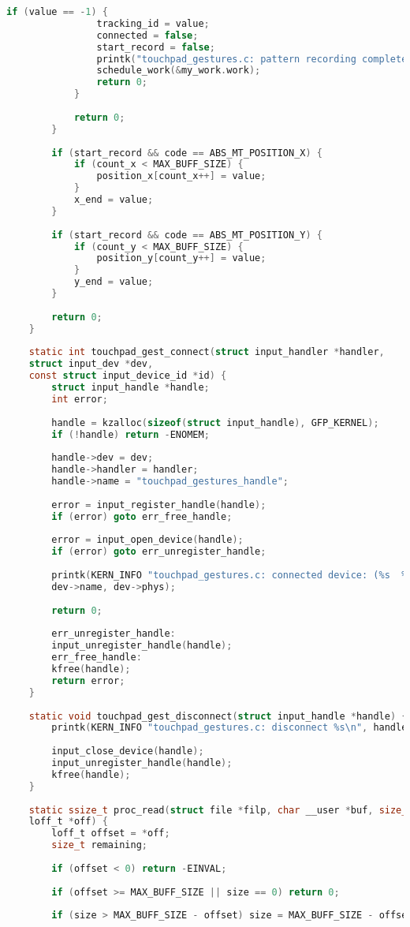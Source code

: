 \begin{lstlisting}[label=lst:module,caption=Реализация загружаемого модуля ядра, language=c]
			if (value == -1) {
				tracking_id = value;
				connected = false;
				start_record = false;
				printk("touchpad_gestures.c: pattern recording complete");
				schedule_work(&my_work.work);
				return 0;
			}
			
			return 0;
		}
		
		if (start_record && code == ABS_MT_POSITION_X) {
			if (count_x < MAX_BUFF_SIZE) {
				position_x[count_x++] = value;
			}
			x_end = value;
		}
		
		if (start_record && code == ABS_MT_POSITION_Y) {
			if (count_y < MAX_BUFF_SIZE) {
				position_y[count_y++] = value;
			}
			y_end = value;
		}
		
		return 0;
	}
	
	static int touchpad_gest_connect(struct input_handler *handler,
	struct input_dev *dev,
	const struct input_device_id *id) {
		struct input_handle *handle;
		int error;
		
		handle = kzalloc(sizeof(struct input_handle), GFP_KERNEL);
		if (!handle) return -ENOMEM;
		
		handle->dev = dev;
		handle->handler = handler;
		handle->name = "touchpad_gestures_handle";
		
		error = input_register_handle(handle);
		if (error) goto err_free_handle;
		
		error = input_open_device(handle);
		if (error) goto err_unregister_handle;
		
		printk(KERN_INFO "touchpad_gestures.c: connected device: (%s  %s)\n",
		dev->name, dev->phys);
		
		return 0;
		
		err_unregister_handle:
		input_unregister_handle(handle);
		err_free_handle:
		kfree(handle);
		return error;
	}
	
	static void touchpad_gest_disconnect(struct input_handle *handle) {
		printk(KERN_INFO "touchpad_gestures.c: disconnect %s\n", handle->dev->name);
		
		input_close_device(handle);
		input_unregister_handle(handle);
		kfree(handle);
	}
	
	static ssize_t proc_read(struct file *filp, char __user *buf, size_t size,
	loff_t *off) {
		loff_t offset = *off;
		size_t remaining;
		
		if (offset < 0) return -EINVAL;
		
		if (offset >= MAX_BUFF_SIZE || size == 0) return 0;
		
		if (size > MAX_BUFF_SIZE - offset) size = MAX_BUFF_SIZE - offset;
		

\end{lstlisting}
